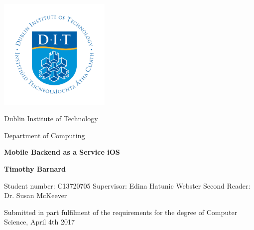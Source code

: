\begin{titlepage}
    \begin{center}
        \vspace{0.8cm}
        \includegraphics[width=0.4\textwidth]{images/DIT_logo}
        
        \linespread{1.5}
        {\Large Dublin Institute of Technology \\}
        
        {\Large Department of Computing}
        
        \vspace{0.5cm}
        {\huge\textbf{ Mobile Backend as a Service iOS}}
        
        \vspace{1.5cm}
        {\Large \textbf{Timothy Barnard}}
        
        \linebreak
        Student number: C13720705
        \linebreak
        \linebreak
        Supervisor: Edina Hatunic Webster
        \linebreak
        Second Reader: Dr. Susan McKeever
        \vfill
        
        {\footnotesize Submitted in part fulfilment of the requirements for the degree of }
        \linebreak
        {\footnotesize Computer Science, April 4th 2017}
        \vfil
    \end{center}
\end{titlepage}
\cleardoublepage

%   
%   
